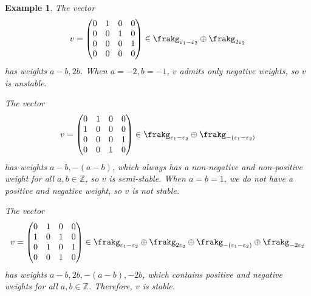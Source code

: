 \documentclass[12pt]{amsart}
\theoremstyle{plain}
\newtheorem{example}[theorem]{Example}
\begin{document}
\begin{example}
The vector 
$$v = 
\begin{pmatrix}
	0 & 1 & 0 & 0 \\
	0 & 0 & 1 & 0 \\
	0 & 0 & 0 & 1 \\
	0 & 0 & 0 & 0 
\end{pmatrix} \in \frakg_{\varepsilon_1 - \varepsilon_2} \oplus \frakg_{2 \varepsilon_2}
$$
has weights $a-b, 2b$.
When $a = -2, b = -1$, $v$ admits only negative weights, so $v$ is unstable.

The vector 
$$v = 
\begin{pmatrix}
	0 & 1 & 0 & 0 \\
	1 & 0 & 0 & 0 \\
	0 & 0 & 0 & 1 \\
	0 & 0 & 1 & 0 
\end{pmatrix} \in \frakg_{\varepsilon_1 - \varepsilon_2} \oplus \frakg_{-(\varepsilon_1 -  \varepsilon_2)}
$$
has weights $a-b, -(a-b)$, which always has a non-negative and non-positive weight for all $a, b \in \mathbb{Z}$, so $v$ is semi-stable.
When $a=b=1$, we do not have a positive and negative weight, so $v$ is not stable.

The vector
$$v = 
\begin{pmatrix}
	0 & 1 & 0 & 0 \\
	1 & 0 & 1 & 0 \\
	0 & 1 & 0 & 1 \\
	0 & 0 & 1 & 0 
\end{pmatrix} \in \frakg_{\varepsilon_1 - \varepsilon_2} \oplus \frakg_{2 \varepsilon_2} \oplus \frakg_{-(\varepsilon_1 -  \varepsilon_2)} \oplus \frakg_{- 2\varepsilon_2} 
$$
has weights $a-b, 2b, -(a-b), -2b$, which contains positive and negative weights for all $a, b \in \mathbb{Z}$.
Therefore, $v$ is stable.
\end{example}
\end{document}
